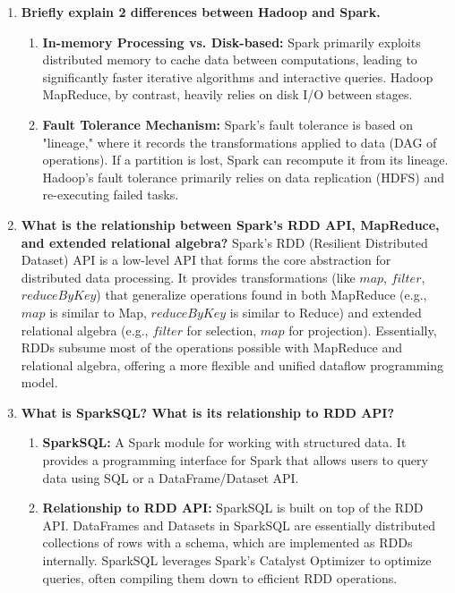 \documentclass{article}
\begin{document}
\begin{enumerate}
    \item \textbf{Briefly explain 2 differences between Hadoop and Spark.}
    \begin{enumerate}[label=\alph*)]
        \item \textbf{In-memory Processing vs. Disk-based:} Spark primarily exploits distributed memory to cache data between computations, leading to significantly faster iterative algorithms and interactive queries. Hadoop MapReduce, by contrast, heavily relies on disk I/O between stages.
        \item \textbf{Fault Tolerance Mechanism:} Spark's fault tolerance is based on "lineage," where it records the transformations applied to data (DAG of operations). If a partition is lost, Spark can recompute it from its lineage. Hadoop's fault tolerance primarily relies on data replication (HDFS) and re-executing failed tasks.
    \end{enumerate}

    \item \textbf{What is the relationship between Spark's RDD API, MapReduce, and extended relational algebra?}
    Spark's RDD (Resilient Distributed Dataset) API is a low-level API that forms the core abstraction for distributed data processing. It provides transformations (like $map$, $filter$, $reduceByKey$) that generalize operations found in both MapReduce (e.g., $map$ is similar to Map, $reduceByKey$ is similar to Reduce) and extended relational algebra (e.g., $filter$ for selection, $map$ for projection). Essentially, RDDs subsume most of the operations possible with MapReduce and relational algebra, offering a more flexible and unified dataflow programming model.

    \item \textbf{What is SparkSQL? What is its relationship to RDD API?}
    \begin{enumerate}[label=\alph*)]
        \item \textbf{SparkSQL:} A Spark module for working with structured data. It provides a programming interface for Spark that allows users to query data using SQL or a DataFrame/Dataset API.
        \item \textbf{Relationship to RDD API:} SparkSQL is built on top of the RDD API. DataFrames and Datasets in SparkSQL are essentially distributed collections of rows with a schema, which are implemented as RDDs internally. SparkSQL leverages Spark's Catalyst Optimizer to optimize queries, often compiling them down to efficient RDD operations.


\end{enumerate}
\end{enumerate}
\end{document}
